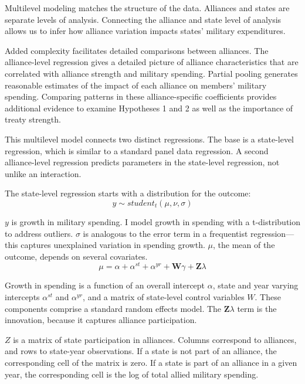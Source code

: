\documentclass[12pt]{article}
\begin{document}
Multilevel modeling matches the structure of the data.
Alliances and states are separate levels of analysis. 
Connecting the alliance and state level of analysis allows us to infer how alliance variation impacts states' military expenditures. 


Added complexity facilitates detailed comparisons between alliances. 
The alliance-level regression gives a detailed picture of alliance characteristics that are correlated with alliance strength and military spending.
Partial pooling generates reasonable estimates of the impact of each alliance on members' military spending. 
Comparing patterns in these alliance-specific coefficients provides additional evidence to examine Hypotheses 1 and 2 as well as the importance of treaty strength. 


This multilevel model connects two distinct regressions. 
The base is a state-level regression, which is similar to a standard panel data regression.
A second alliance-level regression predicts parameters in the state-level regression, not unlike an interaction. 


The state-level regression starts with a distribution for the outcome:
\begin{equation}
y \sim student_t(\mu, \nu, \sigma)
\end{equation}
 
$y$ is growth in military spending. 
I model growth in spending with a t-distribution to address outliers.
$\sigma$ is analogous to the error term in a frequentist regression--- this captures unexplained variation in spending growth.  
$\mu$, the mean of the outcome, depends on several covariates.
\begin{equation}
\mu = \alpha + \alpha^{st} + \alpha^{yr} +\textbf{W} \gamma + \textbf{Z} \lambda
\end{equation}


Growth in spending is a function of an overall intercept $\alpha$, state and year varying intercepts $\alpha^{st}$ and $\alpha^{yr}$, and a matrix of state-level control variables \textbf{$W$}.
These components comprise a standard random effects model. 
The $\textbf{Z} \lambda$ term is the innovation, because it captures alliance participation.


\textbf{$Z$} is a matrix of state participation in alliances. 
Columns correspond to alliances, and rows to state-year observations. 
If a state is not part of an alliance, the corresponding cell of the matrix is zero.
If a state is part of an alliance in a given year, the corresponding cell is the log of total allied military spending. 
\end{document}
